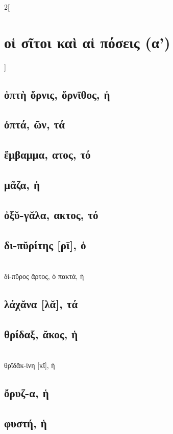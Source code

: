 \documentclass{book}
\begin{document}
\newpage  
\begin{multicols}{2}[\section{οἱ σῖτοι καὶ αἱ πόσεις (α')}]
\subsection{ὀπτὴ ὄρνις, ὄρνῑθος, ἡ}
\subsection{ὀπτά, ῶν, τά}
\subsection{ἔμβαμμα, ατος, τό}
\subsection{μᾶζα, ἡ}
\subsection{ὀξῠ-γᾰλα, ακτος, τό}
\subsection{δι-πῠρίτης [ρῑ], ὁ}
 ~\\
δί-πῠρος ἄρτος, ὁ
πακτά, ἡ
\subsection{λάχᾰνα [λᾰ], τά}
\subsection{θρίδαξ, ᾰκος, ἡ}
 ~\\ 
θρῐδᾰκ-ίνη [κῑ], ἡ
\subsection{ὄρυζ-α, ἡ}
\subsection{φυστή, ἡ}

\end{multicols}
\end{document}
